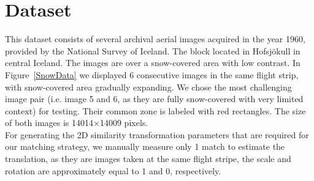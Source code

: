 \section{Dataset}
This dataset consists of several archival aerial images acquired in the year 1960, provided by the National Survey of Iceland. The block located in Hofsjökull in central Iceland. The images are over a snow-covered area with low contrast. In Figure~\ref{SnowData} we displayed 6 consecutive images in the same flight strip, with snow-covered area gradually expanding. We chose the most challenging image pair (i.e. image 5 and 6, as they are fully snow-covered with very limited context) for testing. Their common zone is labeled with red rectangles. The size of both images is 14014$\times$14009 pixels.\\
For generating the 2D similarity transformation parameters that are required for our matching strategy, we manually measure only 1 match to estimate the translation, as they are images taken at the same flight stripe, the scale and rotation are approximately equal to 1 and 0, respectively.\\

